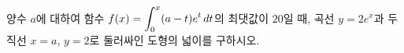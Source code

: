 양수 $a$에 대하여 함수 $f(x)=\displaystyle\int_{0}^{x} (a-t)e^t\mkern3mu dt$의 최댓값이 $20$일 때, 곡선 $y=2e^x$과 두 직선 $x=a$, $y=2$로 둘러싸인 도형의 넓이를 구하시오.
